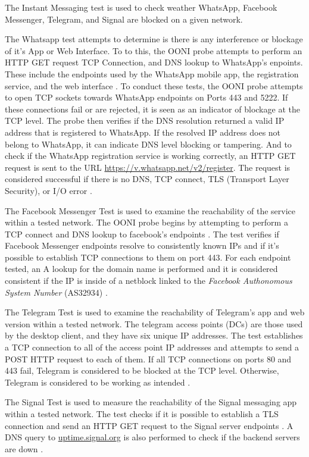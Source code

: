 The Instant Messaging test is used to check weather WhatsApp, Facebook Messenger, Telegram, and Signal are blocked on a given network.

The Whatsapp test attempts to determine is there is any interference or blockage of it's App or Web Interface. To to this, the OONI probe attempts to perform an HTTP GET request TCP Connection, and DNS lookup to WhatsApp's enpoints. These include the endpoints used by the WhatsApp mobile app, the registration service, and the web interface \cite{ooniWhatsAppTest}. To conduct these tests, the OONI probe attempts to open TCP sockets towards WhatsApp endpoints on Ports 443 and 5222. If these connections fail or are rejected, it is seen as an indicator of blockage at the TCP level. The probe then verifies if the DNS resolution returned a valid IP address that is registered to WhatsApp. If the resolved IP address does not belong to WhatsApp, it can indicate DNS level blocking or tampering. And to check if the WhatsApp registration service is working correctly, an HTTP GET request is sent to the URL \url{https://v.whatsapp.net/v2/register}. The request is considered successful if there is no DNS, TCP connect, TLS (Transport Layer Security), or I/O error \cite{WhatsAppTestGitHub}. 

The Facebook Messenger Test is used to examine the reachability of the service within a tested network. The OONI probe begins by attempting to perform a TCP connect and DNS lookup to facebook's endpoints \cite{ooniFacebookMessenger}. The test verifies if Facebook Messenger endpoints resolve to consistently known IPs and if it's possible to establish TCP connections to them on port 443. For each endpoint tested, an A lookup for the domain name is performed and it is considered consistent if the IP is inside of a netblock linked to the \textit{Facebook Authonomous System Number} (AS32934) \cite{FacebookTestGitHub}.

The Telegram Test is used to examine the reachability of Telegram's app and web version within a tested network. The telegram access points (DCs) are those used by the desktop client, and they have six unique IP addresses. The test establishes a TCP connection to all of the access point IP addresses and attempts to send a POST HTTP request to each of them. If all TCP connections on ports 80 and 443 fail, Telegram is considered to be blocked at the TCP level. Otherwise, Telegram is considered to be working as intended \cite{TelegramTestGitHub}. 

The Signal Test is used to measure the reachability of the Signal messaging app within a tested network. The test checks if it is possible to establish a TLS connection and send an HTTP GET request to the Signal server endpoints \cite{ooniSignalTest}. A DNS query to \url{uptime.signal.org} is also performed to check if the backend servers are down \cite{SignalTestGitHub}. 

